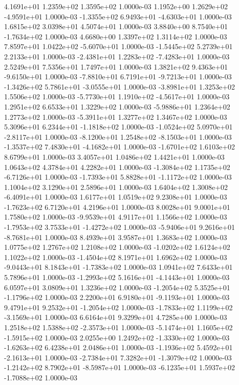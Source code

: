 4.1691e+01 1.2359e+02 1.3595e+02  1.0000e-03
 1.1952e+00  1.2629e+02 -4.9591e+01  1.0000e-03
-1.3355e+02  6.9493e+01 -4.6303e+01  1.0000e-03
1.6815e+02 3.0398e+01 4.5074e+01  1.0000e-03
 3.8840e+00  8.7540e+01 -1.7634e+02  1.0000e-03
4.6680e+00 1.3397e+02 1.3114e+02  1.0000e-03
 7.8597e+01  1.0422e+02 -5.6070e+01  1.0000e-03
-1.5445e+02  5.2739e+01  2.2133e+01  1.0000e-03
-2.4381e+01  1.2283e+02 -7.4283e+01  1.0000e-03
2.5249e+01 7.5356e+01 1.7497e+01  1.0000e-03
 1.3821e+02  9.4363e+01 -9.6150e+01  1.0000e-03
-7.8810e+01  6.7191e+01 -9.7213e+01  1.0000e-03
-1.3426e+02  5.7861e+01 -3.0555e+01  1.0000e-03
-3.8981e+01  1.3253e+02  1.5506e+02  1.0000e-03
-5.7730e+01  1.1910e+02 -4.5617e+01  1.0000e-03
1.2951e+02 6.6533e+01 1.3229e+02  1.0000e-03
-5.9886e+01  1.2364e+02  1.2773e+02  1.0000e-03
-5.3911e+01  1.3277e+02  1.3467e+02  1.0000e-03
 5.3096e+01  6.2344e+01 -1.1818e+02  1.0000e-03
-1.0524e+02  5.0970e+01 -2.8117e+01  1.0000e-03
-8.1200e+01  1.2548e+02 -8.1503e+01  1.0000e-03
-1.3537e+02  7.4830e+01 -4.1682e+01  1.0000e-03
-1.6701e+02  1.6103e+02  8.6799e+01  1.0000e-03
3.4057e+01 1.0486e+02 1.4421e+01  1.0000e-03
1.0643e+02 4.3784e+01 4.2282e+01  1.0000e-03
-1.3084e+02  1.1735e+02 -6.7126e+01  1.0000e-03
-1.7393e+01  5.8828e+01 -1.1172e+02  1.0000e-03
1.1004e+02 3.1290e+01 2.5896e+01  1.0000e-03
 1.6404e+02  1.3008e+02 -6.4091e+01  1.0000e-03
1.6177e+01 1.0519e+02 9.2308e+01  1.0000e-03
-1.7623e+02  6.7120e+01  4.2196e+01  1.0000e-03
8.0028e+01 9.0001e+01 1.7580e+02  1.0000e-03
-9.9539e+01  4.9117e+01  1.1566e+02  1.0000e-03
-1.7953e+02  3.7533e+01 -1.4272e+02  1.0000e-03
-5.9406e+01  9.2616e+01 -8.7681e+01  1.0000e-03
8.4939e+01 3.9587e+01 1.3683e+02  1.0000e-03
1.0775e+02 1.2767e+02 1.2108e+02  1.0000e-03
-1.0202e+02  1.6124e+02  1.1022e+02  1.0000e-03
-1.4504e+02  8.1971e+01  1.6962e+02  1.0000e-03
-9.0443e+01  8.1843e+01 -1.7383e+02  1.0000e-03
1.0941e+02 7.6433e+01 5.7896e+01  1.0000e-03
-1.2993e+02  5.1616e+01 -4.1443e+01  1.0000e-03
6.0597e+01 3.0809e+01 1.3236e+02  1.0000e-03
-1.2054e+02  5.3525e+01 -1.1796e+02  1.0000e-03
 2.2200e+01  6.9180e+01 -9.1193e+01  1.0000e-03
 9.4791e+01  9.2532e+01 -1.2054e+02  1.0000e-03
-1.7833e+02  1.1199e+02 -3.1569e+01  1.0000e-03
6.6164e+01 9.3299e+01 4.7285e+00  1.0000e-03
 1.2518e+02  1.5388e+02 -2.3573e+01  1.0000e-03
-5.1474e+01  1.1605e+02 -1.5915e+02  1.0000e-03
 2.0255e+00  1.2492e+02 -1.3330e+02  1.0000e-03
-1.6263e+02  6.4238e+01  2.0486e+01  1.0000e-03
-1.1936e+02  5.4592e+01 -2.1613e+01  1.0000e-03
-2.7384e+01  7.3282e+01 -1.3079e+02  1.0000e-03
-1.2142e+02  8.7902e+01 -8.5987e+01  1.0000e-03
-6.1235e+01  1.5937e+02 -1.7088e+02  1.0000e-03
